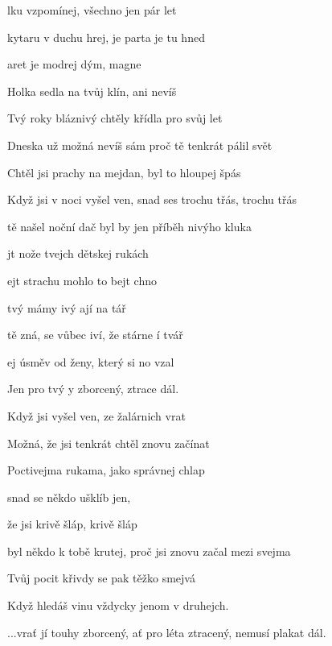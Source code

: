 


\zs
{}lku vzpomínej,  všechno jen pár let

 kytaru v duchu hrej, je parta je tu hned

aret je modrej dým,  magne

Holka sedla na tvůj klín,  ani 
nevíš     
\ks

\zs
Tvý roky bláznivý chtěly křídla pro svůj let

Dneska už možná nevíš sám proč tě tenkrát pálil svět

Chtěl jsi prachy na mejdan, byl to hloupej špás

Když jsi v noci vyšel ven, snad ses trochu třás, trochu třás
\ks

\zs
{} tě našel noční dač byl by  jen příběh nivýho kluka

jt nože  tvejch dětskej rukách

ejt strachu mohlo to bejt chno  
\ks

\zr
{} tvý mámy ivý ají na tář

 tě zná, se vůbec iví, že stárne í tvář 

ej úsměv od ženy, který si no vzal

Jen pro tvý y zborcený,  ztrace  dál.
\kr

\zs
Když jsi vyšel ven, ze žalárnich vrat

Možná, že jsi tenkrát chtěl znovu začínat

Poctivejma rukama, jako správnej chlap

snad se někdo ušklíb jen,

že jsi krivě šláp, krivě šláp
\ks

\zs
{} byl někdo k tobě krutej, proč jsi znovu začal mezi svejma

Tvůj pocit křivdy se pak těžko smejvá

Když hledáš vinu vždycky jenom v druhejch.
\ks

\zr
...vrať jí touhy zborcený, ať pro léta ztracený, nemusí plakat dál.
\kr


\kp






